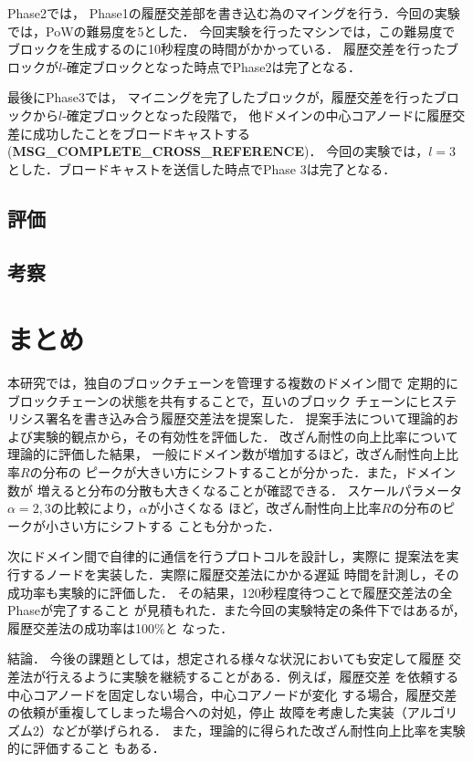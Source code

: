 \documentclass[a4paper,12pt]{jsarticle}
\begin{document}
Phase2では，
Phase1の履歴交差部を書き込む為のマイングを行う．今回の実験では，PoWの難易度を5とした．
今回実験を行ったマシンでは，この難易度でブロックを生成するのに10秒程度の時間がかかっている．
履歴交差を行ったブロックが$l$-確定ブロックとなった時点でPhase2は完了となる．

最後にPhase3では，
マイニングを完了したブロックが，履歴交差を行ったブロックから$l$-確定ブロックとなった段階で，
他ドメインの中心コアノードに履歴交差に成功したことをブロードキャストする
 (\textbf{MSG\_COMPLETE\_CROSS\_REFERENCE})．
今回の実験では，$l=3$とした．ブロードキャストを送信した時点でPhase 3は完了となる．

\subsection{評価}
\subsection{考察}
\newpage
\section{まとめ}
本研究では，独自のブロックチェーンを管理する複数のドメイン間で
定期的にブロックチェーンの状態を共有することで，互いのブロック
チェーンにヒステリシス署名を書き込み合う履歴交差法を提案した．
提案手法について理論的および実験的観点から，その有効性を評価した．
改ざん耐性の向上比率について理論的に評価した結果，
一般にドメイン数が増加するほど，改ざん耐性向上比率$R$の分布の
ピークが大きい方にシフトすることが分かった．また，ドメイン数が
増えると分布の分散も大きくなることが確認できる．
スケールパラメータ$\alpha=2,3$の比較により，$\alpha$が小さくなる
ほど，改ざん耐性向上比率$R$の分布のピークが小さい方にシフトする
ことも分かった．

次にドメイン間で自律的に通信を行うプロトコルを設計し，実際に
提案法を実行するノードを実装した．実際に履歴交差法にかかる遅延
時間を計測し，その成功率も実験的に評価した．
その結果，120秒程度待つことで履歴交差法の全Phaseが完了すること
が見積もれた．また今回の実験特定の条件下ではあるが，履歴交差法の成功率は100\%と
なった．


結論．
今後の課題としては，想定される様々な状況においても安定して履歴
交差法が行えるように実験を継続することがある．例えば，履歴交差
を依頼する中心コアノードを固定しない場合，中心コアノードが変化
する場合，履歴交差の依頼が重複してしまった場合への対処，停止
故障を考慮した実装（アルゴリズム2）などが挙げられる．
また，理論的に得られた改ざん耐性向上比率を実験的に評価すること
もある．
\end{document}
